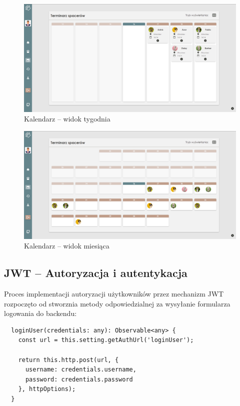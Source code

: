 \begin{figure}[H]
  \centering
  \includegraphics[width=1\linewidth]{rysunki/walker-5.PNG}
  \caption{Kalendarz -- widok tygodnia}
  \label{fig:walker-calendar-week}
\end{figure}


\begin{figure}[H]
  \centering
  \includegraphics[width=1\linewidth]{rysunki/walker-7.PNG}
  \caption{Kalendarz -- widok miesiąca}
  \label{fig:walker-calendar-month}
\end{figure}


\subsection{JWT -- Autoryzacja i autentykacja}
Proces implementacji autoryzacji użytkowników przez mechanizm JWT rozpoczęto od stworznia metody odpowiedzialnej za wysyłanie formularza logowania do backendu:
\begin{lstlisting}
  loginUser(credentials: any): Observable<any> {
    const url = this.setting.getAuthUrl('loginUser');

    return this.http.post(url, {
      username: credentials.username,
      password: credentials.password
    }, httpOptions);
  }
\end{lstlisting}

